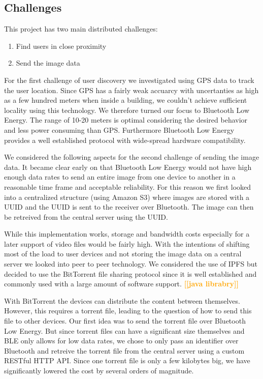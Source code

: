 \documentclass{report}
\newcommand{\todo}[1]{\textsf{\textbf{\textcolor{orange}{[[#1]]}}}}
\begin{document}
\subsection{Challenges}
This project has two main distributed challenges:
\begin{enumerate} 
    \item Find users in close proximity
    \item Send the image data
\end{enumerate}

For the first challenge of user discovery we investigated using GPS data to track the user location. Since GPS has a fairly weak accuarcy with uncertanties as high as a few hundred meters when inside a building, we couldn't achieve sufficient locality using this technology. We therefore turned our focus to Bluetooth Low Energy. The range of 10-20 meters is optimal considering the desired behavior and less power consuming than GPS. Furthermore Bluetooth Low Energy provides a well established protocol with wide-spread hardware compatibility.

We considered the following aspects for the second challenge of sending the image data.
It became clear early on that Bluetooth Low Energy would not have high enough data rates to send an entire image from one device to another in a reasonable time frame and acceptable reliability. For this reason we first looked into a centralized structure (using Amazon S3) where images are stored with a UUID and the UUID is sent to the receiver over Bluetooth. The image can then be retreived from the central server using the UUID.

While this implementation works, storage and bandwidth costs especially for a later support of video files would be fairly high. With the intentions of shifting most of the load to user devices and not storing the image data on a central server we looked into peer to peer technology. We considered the use of IPFS but decided to use the BitTorrent file sharing protocol since it is well established and commonly used with a large amount of software support. \todo{java librabry} 

With BitTorrent the devices can distribute the content between themselves. However, this requires a torrent file, leading to the question of how to send this file to other devices. Our first idea was to send the torrent file over Bluetooth Low Energy. But since torrent files can have a significant size themselves and BLE only allows for low data rates, we chose to only pass an identifier over Bluetooth and retreive the torrent file from the central server  using a custom RESTful HTTP API. Since one torrent file is only a few kilobytes big, we have significantly lowered the cost by several orders of magnitude.
\end{document}
